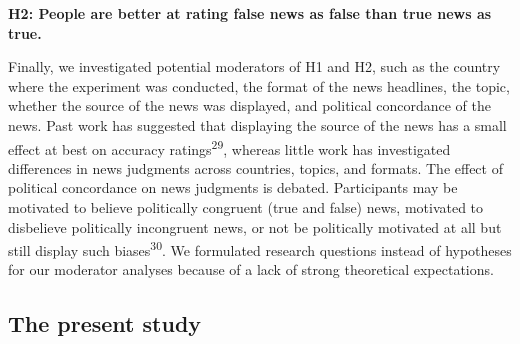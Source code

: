 \documentclass[
  man]{apa6}
\begin{document}
\textbf{H2: People are better at rating false news as false than true news as true.}

Finally, we investigated potential moderators of H1 and H2, such as the country where the experiment was conducted, the format of the news headlines, the topic, whether the source of the news was displayed, and political concordance of the news. Past work has suggested that displaying the source of the news has a small effect at best on accuracy ratings\textsuperscript{29}, whereas little work has investigated differences in news judgments across countries, topics, and formats. The effect of political concordance on news judgments is debated. Participants may be motivated to believe politically congruent (true and false) news, motivated to disbelieve politically incongruent news, or not be politically motivated at all but still display such biases\textsuperscript{30}. We formulated research questions instead of hypotheses for our moderator analyses because of a lack of strong theoretical expectations.

\subsection{The present study}\label{the-present-study}
\end{document}
